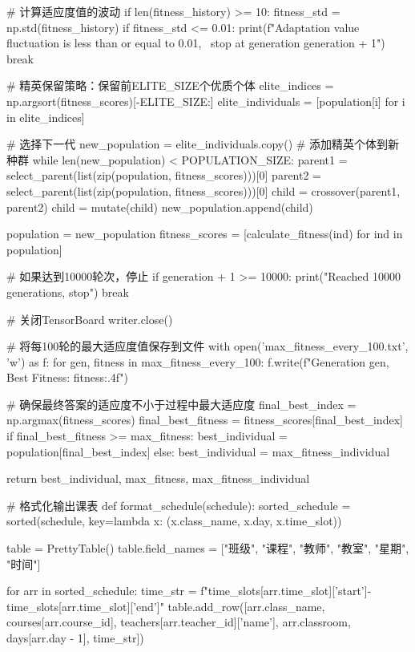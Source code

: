 \documentclass{ctexart}
\begin{document}
\begin{pythoncode}
	        # 计算适应度值的波动
	        if len(fitness_history) >= 10:
	            fitness_std = np.std(fitness_history)
	            if fitness_std <= 0.01:
	                print(f"Adaptation value fluctuation is less than or equal to 0.01, \
	                stop at generation {generation + 1}")
	                break
	
	        # 精英保留策略：保留前ELITE_SIZE个优质个体
	        elite_indices = np.argsort(fitness_scores)[-ELITE_SIZE:]
	        elite_individuals = [population[i] for i in elite_indices]
	
	        # 选择下一代
	        new_population = elite_individuals.copy()  # 添加精英个体到新种群
	        while len(new_population) < POPULATION_SIZE:
	            parent1 = select_parent(list(zip(population, fitness_scores)))[0]
	            parent2 = select_parent(list(zip(population, fitness_scores)))[0]
	            child = crossover(parent1, parent2)
	            child = mutate(child)
	            new_population.append(child)
	
	        population = new_population
	        fitness_scores = [calculate_fitness(ind) for ind in population]
	
	        # 如果达到10000轮次，停止
	        if generation + 1 >= 10000:
	            print("Reached 10000 generations, stop")
	            break
	
	    # 关闭TensorBoard
	    writer.close()
	
	    # 将每100轮的最大适应度值保存到文件
	    with open('max_fitness_every_100.txt', 'w') as f:
	        for gen, fitness in max_fitness_every_100:
	            f.write(f"Generation {gen}, Best Fitness: {fitness:.4f}\n")
	
	    # 确保最终答案的适应度不小于过程中最大适应度
	    final_best_index = np.argmax(fitness_scores)
	    final_best_fitness = fitness_scores[final_best_index]
	    if final_best_fitness >= max_fitness:
	        best_individual = population[final_best_index]
	    else:
	        best_individual = max_fitness_individual
	
	    return best_individual, max_fitness, max_fitness_individual
	
	
	# 格式化输出课表
	def format_schedule(schedule):
	    sorted_schedule = sorted(schedule, key=lambda x: (x.class_name, x.day, x.time_slot))
	
	    table = PrettyTable()
	    table.field_names = ["班级", "课程", "教师", "教室", "星期", "时间"]
	
	    for arr in sorted_schedule:
	        time_str = f"{time_slots[arr.time_slot]['start']}-{time_slots[arr.time_slot]['end']}"
	        table.add_row([arr.class_name, courses[arr.course_id],
	                       teachers[arr.teacher_id]['name'],
	                       arr.classroom, days[arr.day - 1], time_str])
	

\end{pythoncode}
\end{document}
